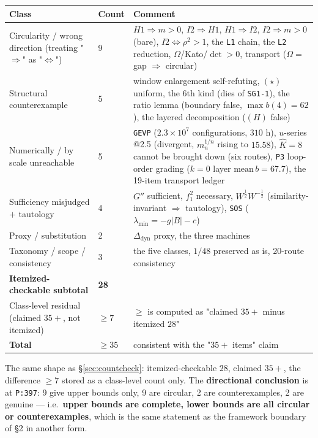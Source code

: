 \documentclass[11pt,a4paper]{article}
\newcommand{\Ddyn}{\Delta_{\mathrm{dyn}}}
\begin{document}
\begin{center}
\small
\begin{tabularx}{\textwidth}{@{}L{3.5cm} L{1.2cm} Y@{}}
\toprule
\textbf{Class} & \textbf{Count} & \textbf{Comment} \\
\midrule
Circularity / wrong direction (treating "$\Rightarrow$" as "$\Longleftrightarrow$") & 9 & $H1\Rightarrow m>0$, $I2\Rightarrow H1$, $H1\Rightarrow I2$, $I2\Rightarrow m>0$ (bare), $I2\Longleftrightarrow\rho^2>1$, the \texttt{L1} chain, the \texttt{L2} reduction, $\Omega$/Kato/$\det>0$, transport ($\Omega=$ gap $\Rightarrow$ circular)\\
Structural counterexample & 5 & window enlargement self-refuting, $(\star)$ uniform, the 6th kind (dies of \texttt{SG1-1}), the ratio lemma (boundary false, $\max b(4)=62$), the layered decomposition ($(H)$ false)\\
Numerically / by scale unreachable & 5 & \texttt{GEVP} ($2.3\times10^7$ configurations, $310$ h), $u$-series @2.5 (divergent, $m_n^{1/n}$ rising to $15.58$), $\hat K=8$ cannot be brought down (six routes), \texttt{P3} loop-order grading ($k=0$ layer $\mathrm{mean}\,b=67.7$), the 19-item transport ledger\\
Sufficiency misjudged $+$ tautology & 4 & $G''$ sufficient, $f_1^2$ necessary, $W^{\frac12}W^{-\frac12}$ (similarity-invariant $\Rightarrow$ tautology), \texttt{SOS} ($\lambda_{\min}=-g|B|-c$)\\
Proxy / substitution & 2 & $\Ddyn$ proxy, the three machines \\
Taxonomy / scope / consistency & 3 & the five classes, $1/48$ preserved as is, 20-route consistency \\
\midrule
\textbf{Itemized-checkable subtotal} & \textbf{28} & \\
\midrule
Class-level residual (claimed $35+$, not itemized) & $\ge 7$ & $\ge$ is computed as "claimed $35+$ minus itemized $28$" \\
\midrule
\textbf{Total} & $\ge 35$ & consistent with the "$35+$ items" claim \\
\bottomrule
\end{tabularx}
\end{center}

\noindent The same shape as \S\ref{sec:countcheck}: itemized-checkable $28$, claimed $35+$, the difference $\ge 7$ stored as a class-level count only. The \textbf{directional conclusion} is at \texttt{P:397}: 9 give upper bounds only, 9 are circular, 2 are counterexamples, 2 are genuine --- i.e.\ \textbf{upper bounds are complete, lower bounds are all circular or counterexamples}, which is the same statement as the framework boundary of \S2 in another form.
\end{document}
